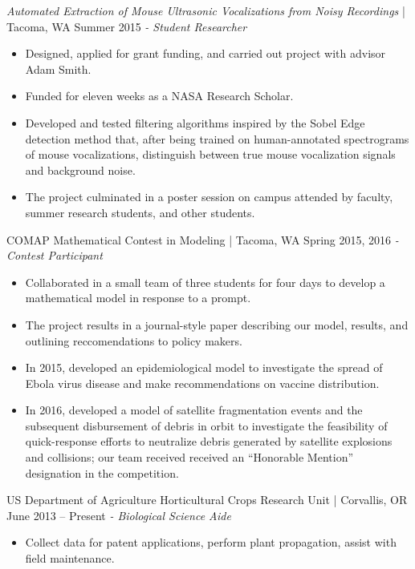 \documentclass[letter]{res}
\begin{document}
\begin{resume}
\textit{Automated Extraction of Mouse Ultrasonic Vocalizations from Noisy Recordings} | Tacoma, WA \hfill Summer 2015 \newline 
\textit{- Student Researcher} \\
  \vspace{-4.5mm}
 \begin{itemize}
 \item Designed, applied for grant funding, and carried out project with advisor Adam Smith.
 \item Funded for eleven weeks as a NASA Research Scholar.
 \item Developed and tested filtering algorithms inspired by the Sobel Edge detection method that, after being trained on human-annotated spectrograms of mouse vocalizations, distinguish between true mouse vocalization signals and background noise.
 \item The project culminated in a poster session on campus attended by faculty, summer research students, and other students. 
 \end{itemize}
  \vspace{-3.5mm}
  
COMAP Mathematical Contest in Modeling | Tacoma, WA \hfill Spring 2015, 2016 \newline 
\textit{- Contest Participant} \\
  \vspace{-4.5mm}
 \begin{itemize}
 \item Collaborated in a small team of three students for four days to develop a mathematical model in response to a prompt.
 \item The project results in a journal-style paper describing our model, results, and outlining reccomendations to policy makers.
 \item In 2015, developed an epidemiological model to investigate the spread of Ebola virus disease and make recommendations on vaccine distribution.
 \item In 2016, developed a model of satellite fragmentation events and the subsequent disbursement of debris in orbit to investigate the feasibility of quick-response efforts to neutralize debris generated by satellite explosions and collisions; our team received received an ``Honorable Mention'' designation in the competition.
 \end{itemize}
  \vspace{-3.5mm}

US Department of Agriculture Horticultural Crops Research Unit | Corvallis, OR  \hfill  June 2013 – Present \newline
\textit{- Biological Science Aide}\\
  \vspace{-4.5mm}
 \begin{itemize}
 \item Collect data for patent applications, perform plant propagation, assist with field maintenance.
 \end{itemize}
  \vspace{-3.5mm}
 

\end{resume}
\end{document}
